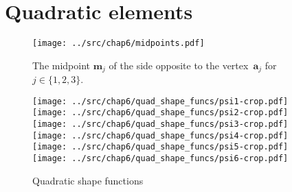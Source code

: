 \section{Quadratic elements}

\begin{figure}
\caption{The midpoint $\boldsymbol{m}_j$ of the side opposite to the 
vertex~$\boldsymbol{a}_j$ for $j\in\{1,2,3\}$.}
\label{fig: midpoints}
\begin{center}
\texttt{[image: ../src/chap6/midpoints.pdf]}
\end{center}
\end{figure}

\begin{figure}
\caption{Quadratic shape functions}
\label{fig: quad shape funcs}
\hfil
\texttt{[image: ../src/chap6/quad\_shape\_funcs/psi1-crop.pdf]}
\hfil
\texttt{[image: ../src/chap6/quad\_shape\_funcs/psi2-crop.pdf]}
\hfil
\texttt{[image: ../src/chap6/quad\_shape\_funcs/psi3-crop.pdf]}
\hfil
\\[2\jot]
\texttt{[image: ../src/chap6/quad\_shape\_funcs/psi4-crop.pdf]}
\hfil
\texttt{[image: ../src/chap6/quad\_shape\_funcs/psi5-crop.pdf]}
\hfil
\texttt{[image: ../src/chap6/quad\_shape\_funcs/psi6-crop.pdf]}
\hfil
\end{figure}


